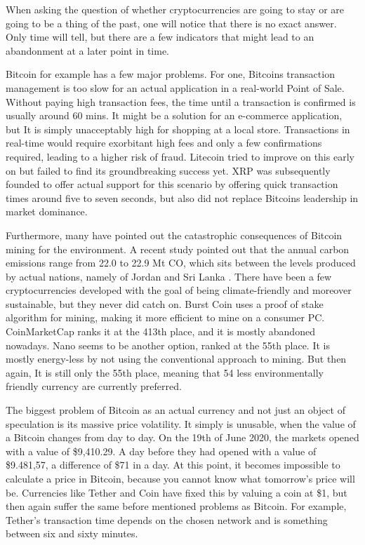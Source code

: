 \documentclass[11pt,a4paper,compsoc,conference]{IEEEtran}
\begin{document}
When asking the question of whether cryptocurrencies are going to stay or are going to be a thing of the past, one will notice that there is no exact answer. Only time will tell, but there are a few indicators that might lead to an abandonment at a later point in time. 

Bitcoin for example has a few major problems. For one, Bitcoins transaction management is too slow for an actual application in a real-world Point of Sale. Without paying high transaction fees, the time until a transaction is confirmed is usually around 60 mins. It might be a solution for an e-commerce application, but It is simply unacceptably high for shopping at a local store. Transactions in real-time would require exorbitant high fees and only a few confirmations required, leading to a higher risk of fraud. Litecoin tried to improve on this early on but failed to find its groundbreaking success yet. XRP was subsequently founded to offer actual support for this scenario by offering quick transaction times around five to seven seconds, but also did not replace Bitcoins leadership in market dominance.

Furthermore, many have pointed out the catastrophic consequences of Bitcoin mining for the environment. A recent study pointed out that the annual carbon emissions range from 22.0 to 22.9 Mt CO, which sits between the levels produced by actual nations, namely of Jordan and Sri Lanka \citep{carbon}. There have been a few cryptocurrencies developed with the goal of being climate-friendly and moreover sustainable, but they never did catch on. Burst Coin uses a proof of stake algorithm for mining, making it more efficient to mine on a consumer PC. CoinMarketCap ranks it at the 413th place, and it is mostly abandoned nowadays. Nano seems to be another option, ranked at the 55th place. It is mostly energy-less by not using the conventional approach to mining. But then again, It is still only the 55th place, meaning that 54 less environmentally friendly currency are currently preferred.

The biggest problem of Bitcoin as an actual currency and not just an object of speculation is its massive price volatility. It simply is unusable, when the value of a Bitcoin changes from day to day. On the 19th of June 2020, the markets opened with a value of \$9,410.29. A day before they had opened with a value of \$9.481,57, a difference of \$71  in a day. At this point, it becomes impossible to calculate a price in Bitcoin, because you cannot know what tomorrow's price will be. Currencies like Tether and  Coin have fixed this by valuing a coin at \$1, but then again suffer the same before mentioned problems as Bitcoin. For example, Tether's transaction time depends on the chosen network and is something between six and sixty minutes. 
\end{document}
